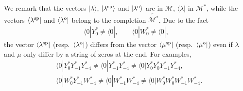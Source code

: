 \documentclass[pdftex]{sigma}
\numberwithin{equation}{section}
\begin{document}
We remark that the vectors $|\lambda\rangle$, $|\lambda^{\rm sp}\rangle$ and $|\lambda^{\rm o}\rangle$ are in $\mathcal{M}$, $\langle \lambda|$ in $\mathcal{M}^*$, while the vectors $\langle \lambda^{\rm sp}|$ and $\langle \lambda^{\rm o}|$ belong to the completion $\widetilde{\mathcal{M}^*}$. Due to the fact
\begin{align*}
\langle 0|Y^*_0\neq \langle 0|,\qquad \langle 0|W^*_0\neq \langle 0|,
\end{align*}
the vector $\langle \lambda^{\rm sp}|$ (resp.\ $\langle \lambda^{\rm o}|$) differs from the vector $\langle \mu^{\rm sp}|$ (resp.\ $\langle \mu^{\rm o}|$) even if $\lambda$ and $\mu$ only differ by a string of zeros at the end.
For examples,
\begin{align*}
&\langle 0|Y^*_{0}Y^*_{-1}Y^*_{-4}\neq\langle 0|Y^*_{-1}Y^*_{-4}\neq\langle 0|Y^*_{0}Y^*_{0}Y^*_{-1}Y^*_{-4},\\
&\langle 0|W^*_{0}Y^*_{-1}W^*_{-4}\neq\langle 0|W^*_{-1}W^*_{-4}\neq\langle 0|W^*_{0}W^*_{0}W^*_{-1}W^*_{-4}.
\end{align*}
\end{document}
